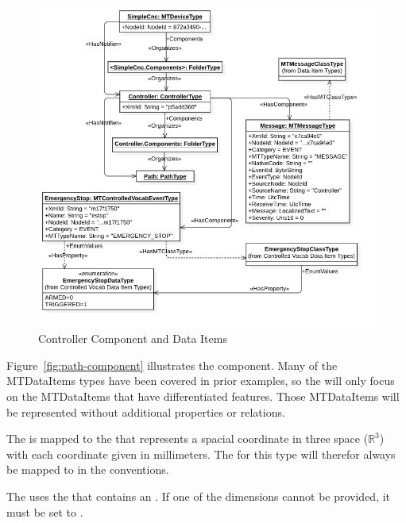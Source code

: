 \begin{figure}[ht]
  \centering
  \includegraphics[width=1.0\textwidth]{diagrams/mtconnect-mapping/controller-component.png}
  \caption{Controller Component and Data Items}
  \label{fig:controller-component}
\end{figure}

Figure~\ref{fig:path-component} illustrates the  component. Many of the \glspl{MTDataItem} types have been covered in prior examples, so the  will only focus on the \glspl{MTDataItem} that have differentiated features. Those \glspl{MTDataItem} will be represented without additional properties or relations.

The  is mapped to the  that represents a spacial coordinate in three space ($\mathbb{R}^{3}$) with each coordinate given in millimeters. The  for this type will therefor always be mapped to  in the  conventions.

The  uses the  that contains an  . If one of the dimensions cannot be provided, it must be set to .

